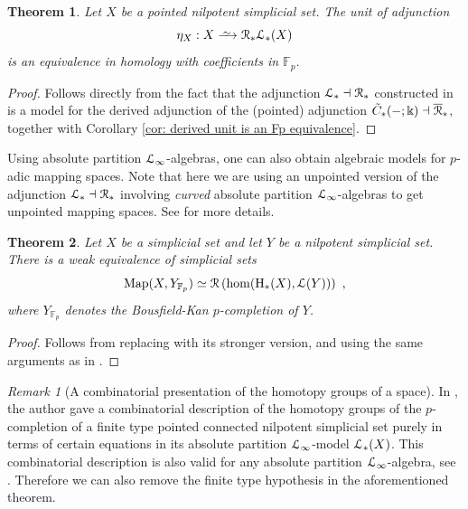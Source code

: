 \documentclass{proc-l}
\renewcommand{\mathcal}{\EuScript}
\theoremstyle{plain}
\newtheorem{theorem}{Theorem}[section]
\theoremstyle{definition}
\theoremstyle{remark}
\newtheorem{remark}[{theorem}]{Remark}
\newcommand{\qi}{\xrightarrow{ \,\smash{\raisebox{-0.65ex}{\ensuremath{\scriptstyle\sim}}}\,}}
\newcommand{\kk}{\Bbbk}
\begin{document}
\begin{theorem}%
\label{Theorem:5.6}Let $X$ be a pointed nilpotent simplicial set. The unit of adjunction
\[
\eta_X: X \qi \mathcal{R}_*\mathcal{L}_*(X)
\]
is an equivalence in homology with coefficients in $\mathbb{F}_p$.
\end{theorem}

\begin{proof}
Follows directly from the fact that the adjunction $\mathcal{L}_* \dashv \mathcal{R}_*$ constructed in \cite[Section 2]{lucio2024higherlietheorypositive} is a model for the derived adjunction of the (pointed) adjunction $\tilde{C}_*(-;\kk) \dashv \overline{\mathcal{R}}_*$, together with Corollary \ref{cor: derived unit is an Fp equivalence}.
\end{proof}

Using absolute partition $\mathcal{L}_\infty$-algebras, one can also obtain algebraic models for $p$-adic mapping spaces. Note that here we are using an unpointed version of the adjunction $\mathcal{L}_* \dashv \mathcal{R}_*$ involving \textit{curved} absolute partition $\mathcal{L}_\infty$-algebras to get unpointed mapping spaces. See \cite{lucio2024higherlietheorypositive} for more details.

\begin{theorem}%
\label{Theorem:5.7}Let $X$ be a simplicial set and let $Y$ be a nilpotent simplicial set. There is a weak equivalence of simplicial sets
\[
\mathrm{Map}(X, Y_{\mathbb{F}_p}) \simeq \mathcal{R}\left(\mathrm{hom}(\mathrm{H}_*(X), \mathcal{L}(Y))\right)~,
\]
where $Y_{\mathbb{F}_p}$ denotes the Bousfield-Kan $p$-completion of $Y$.
\end{theorem}

\begin{proof}
Follows from replacing \cite[Corollary 3.7]{lucio2024higherlietheorypositive} with its stronger version, and using the same arguments as in \cite[Corollary 3.28]{lucio2024higherlietheorypositive}.
\end{proof}

\begin{remark}[{A combinatorial presentation of the homotopy groups of a space}]%
\label{Remark:5.8}
In \cite[Theorem 3.17]{lucio2024higherlietheorypositive}, the author gave a combinatorial description of the homotopy groups of the $p$-completion of a finite type pointed connected nilpotent simplicial set purely in terms of certain equations in its absolute partition $\mathcal{L}_\infty$-model $\mathcal{L}_*(X)$. This combinatorial description is also valid for any absolute partition $\mathcal{L}_\infty$-algebra, see \cite[Theorem B]{lucio2024higherlietheorypositive}. Therefore we can also remove the finite type hypothesis in the aforementioned theorem.
\end{remark}
\end{document}

